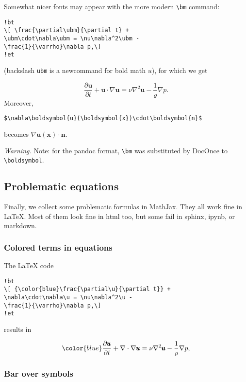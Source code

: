 \documentclass[]{article}
\begin{document}
Somewhat nicer fonts may appear with the more modern
\texttt{\textbackslash{}bm} command:

\begin{verbatim}
!bt
\[ \frac{\partial\ubm}{\partial t} +
\ubm\cdot\nabla\ubm = \nu\nabla^2\ubm -
\frac{1}{\varrho}\nabla p,\]
!et
\end{verbatim}

(backslash \texttt{ubm} is a newcommand for bold math \(u\)), for which
we get

\[
 \frac{\partial\boldsymbol{u}}{\partial t} +
\boldsymbol{u}\cdot\nabla\boldsymbol{u} = \nu\nabla^2\boldsymbol{u} -
\frac{1}{\varrho}\nabla p.
\] Moreover,

\begin{verbatim}
$\nabla\boldsymbol{u}(\boldsymbol{x})\cdot\boldsymbol{n}$
\end{verbatim}

becomes \(\nabla\boldsymbol{u}(\boldsymbol{x})\cdot\boldsymbol{n}\).

\emph{Warning.} Note: for the pandoc format, \texttt{\textbackslash{}bm}
was substituted by DocOnce to \texttt{\textbackslash{}boldsymbol}.

\subsection{Problematic equations}\label{problematic-equations}

Finally, we collect some problematic formulas in MathJax. They all work
fine in LaTeX. Most of them look fine in html too, but some fail in
sphinx, ipynb, or markdown.

\subsubsection{Colored terms in
equations}\label{colored-terms-in-equations}

The LaTeX code

\begin{verbatim}
!bt
\[ {\color{blue}\frac{\partial\u}{\partial t}} +
\nabla\cdot\nabla\u = \nu\nabla^2\u -
\frac{1}{\varrho}\nabla p,\]
!et
\end{verbatim}

results in

\[
 {\color{blue}\frac{\partial\pmb{u}}{\partial t}} +
\nabla\cdot\nabla\pmb{u} = \nu\nabla^2\pmb{u} -
\frac{1}{\varrho}\nabla p,
\]

\subsubsection{Bar over symbols}\label{bar-over-symbols}
\end{document}
